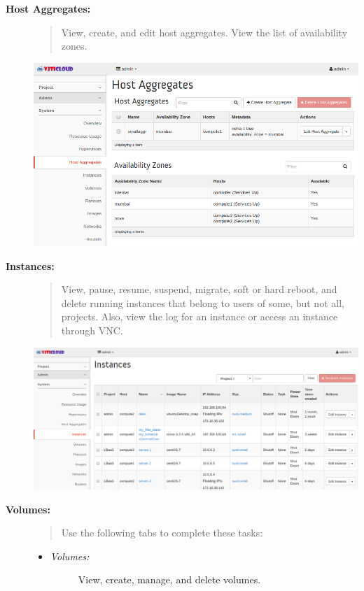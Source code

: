 \documentclass[letterpaper,10pt,english]{sphinxmanual}
\begin{document}
\begin{description}
\item[{\textbf{Host Aggregates:}}] \leavevmode\begin{quote}

View, create, and edit host aggregates. View the list of availability zones.
\end{quote}

\includegraphics{sys_host_aggregates.png}

\item[{\textbf{Instances:}}] \leavevmode\begin{quote}

View, pause, resume, suspend, migrate, soft or hard reboot, and delete running instances that belong to users of some, but not all, projects. Also, view the log for an instance or access an instance through VNC.
\end{quote}

\includegraphics{sys_instances.png}

\item[{\textbf{Volumes:}}] \leavevmode\begin{quote}

Use the following tabs to complete these tasks:
\end{quote}
\begin{itemize}
\item {} \begin{description}
\item[{\emph{Volumes:}}] \leavevmode
View, create, manage, and delete volumes.


\end{description}
\end{itemize}
\end{description}
\end{document}
